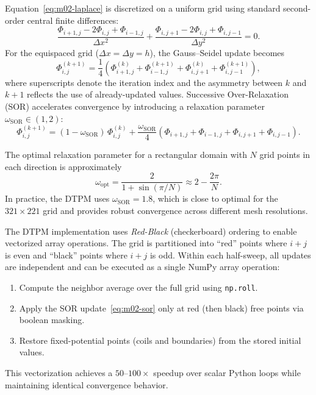 \documentclass[11pt,a4paper]{report}
\newcommand{\dx}{\Delta x}
\newcommand{\dy}{\Delta y}
\begin{document}
Equation~\eqref{eq:m02-laplace} is discretized on a uniform grid using standard second-order central finite differences:
\begin{equation}
  \frac{\Phi_{i+1,j} - 2\Phi_{i,j} + \Phi_{i-1,j}}{\dx^2}
  + \frac{\Phi_{i,j+1} - 2\Phi_{i,j} + \Phi_{i,j-1}}{\dy^2}
  = 0.
  \label{eq:m02-fd-laplace}
\end{equation}
For the equispaced grid ($\dx = \dy = h$), the Gauss--Seidel update becomes
\begin{equation}
  \Phi_{i,j}^{(k+1)} = \frac{1}{4}\!\left(
    \Phi_{i+1,j}^{(k)} + \Phi_{i-1,j}^{(k+1)}
    + \Phi_{i,j+1}^{(k)} + \Phi_{i,j-1}^{(k+1)}
  \right),
  \label{eq:m02-gs}
\end{equation}
where superscripts denote the iteration index and the asymmetry between $k$ and $k+1$ reflects the use of already-updated values.  Successive Over-Relaxation (SOR) accelerates convergence by introducing a relaxation parameter $\omega_\mathrm{SOR} \in (1, 2)$:
\begin{equation}
  \Phi_{i,j}^{(k+1)} = (1 - \omega_\mathrm{SOR})\,\Phi_{i,j}^{(k)}
  + \frac{\omega_\mathrm{SOR}}{4}\!\left(
    \Phi_{i+1,j} + \Phi_{i-1,j}
    + \Phi_{i,j+1} + \Phi_{i,j-1}
  \right).
  \label{eq:m02-sor}
\end{equation}

The optimal relaxation parameter for a rectangular domain with $N$ grid points in each direction is approximately~\cite{Press2007}
\begin{equation}
  \omega_\mathrm{opt} = \frac{2}{1 + \sin(\pi / N)} \approx 2 - \frac{2\pi}{N}.
  \label{eq:m02-omega-opt}
\end{equation}
In practice, the DTPM uses $\omega_\mathrm{SOR} = 1.8$, which is close to optimal for the $321 \times 221$ grid and provides robust convergence across different mesh resolutions.

The DTPM implementation uses \emph{Red-Black} (checkerboard) ordering to enable vectorized array operations.  The grid is partitioned into ``red'' points where $i + j$ is even and ``black'' points where $i + j$ is odd.  Within each half-sweep, all updates are independent and can be executed as a single NumPy array operation:
\begin{enumerate}
  \item Compute the neighbor average over the full grid using \texttt{np.roll}.
  \item Apply the SOR update~\eqref{eq:m02-sor} only at red (then black) free points via boolean masking.
  \item Restore fixed-potential points (coils and boundaries) from the stored initial values.
\end{enumerate}
This vectorization achieves a $50$--$100\times$ speedup over scalar Python loops while maintaining identical convergence behavior.
\end{document}
